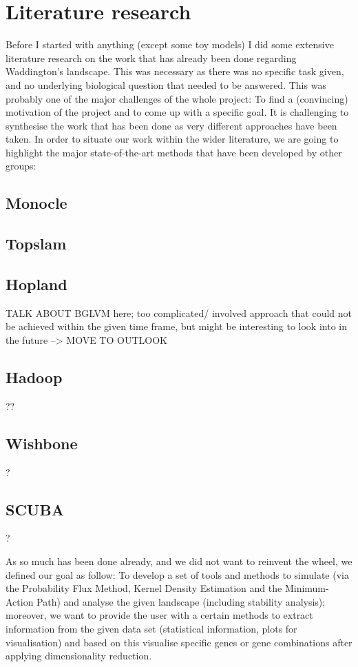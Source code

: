 \documentclass[journal, a4paper]{IEEEtran}
\begin{document}

\section{Literature research}

Before I started with anything (except some toy models) I did some extensive literature research on the work that has already been done regarding Waddington's landscape. This was necessary as there was no specific task given, and no underlying biological question that needed to be answered. This was probably one of the major challenges of the whole project: To find a (convincing) motivation of the project and to come up with a specific goal.
It is challenging to synthesise the work that has been done as very different approaches have been taken. In order to situate our work within the wider literature, we are going to highlight the major state-of-the-art methods that have been developed by other groups:

\subsection{Monocle}
\subsection{Topslam}
\subsection{Hopland}
TALK ABOUT BGLVM here; too complicated/ involved approach that could not be achieved within the given time frame, but might be interesting to look into in the future --> MOVE TO OUTLOOK
\subsection{Hadoop}??
\subsection{Wishbone}?
\subsection{SCUBA}?

As so much has been done already, and we did not want to reinvent the wheel, we defined our goal as follow: To develop a set of tools and methods to simulate (via the Probability Flux Method, Kernel Density Estimation and the Minimum-Action Path) and analyse the given landscape (including stability analysis); moreover, we want to provide the user with a certain methods to extract information from the given data set (statistical information, plots for visualisation) and based on this visualise specific genes or gene combinations after applying dimensionality reduction. 
\end{document}
